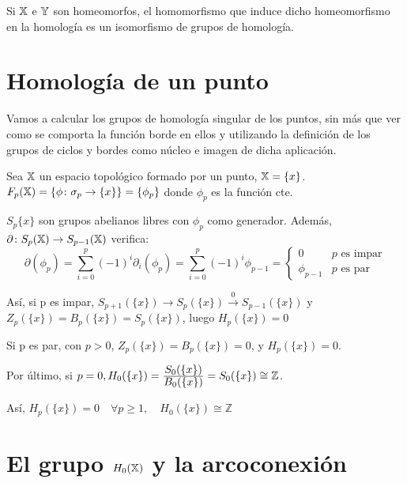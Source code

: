 Si ${\mathbb X}$ e ${\mathbb Y}$ son homeomorfos, el homomorfismo que induce dicho homeomorfismo en la homología es un isomorfismo de grupos de homología.

\pagebreak

\section{Homología de un punto}

Vamos a calcular los grupos de homología singular de los puntos, sin más que ver como se comporta la función borde
en ellos y utilizando la definición de los grupos de ciclos y bordes como núcleo e imagen de dicha aplicación.

Sea ${\mathbb X}$ un espacio topológico formado por un punto, ${\mathbb X} = \{x\}$. \\
$F_{p}({\mathbb X}) = \{ \phi \colon \sigma_p \to \{x\} \} = \{\phi_p\}$ donde $\phi_p$ es la función cte.

$S_p{\{x\}}$ son grupos abelianos libres con $\phi_p$ como generador. Además, $\partial \colon S_{p}({\mathbb X}) \to S_{p-1}({\mathbb X})$ verifica:
\[\partial(\phi_p) = \sum_{i = 0}^p (-1)^i \partial_i(\phi_p) =  \sum_{i = 0}^p (-1)^i \phi_{p-1} = \begin{cases}
                                                                                                            0 & p \text{ es impar} \\
                                                                                                            \phi_{p-1} & p \text{ es par}
                                                                                                    \end{cases}   \]

Así, si p es impar, $S_{p+1}(\{x\}) \to S_p(\{x\}) \xrightarrow{0} S_{p-1}(\{x\})$ y $Z_p(\{x\}) = B_p(\{x\}) = S_p(\{x\})$, luego
$H_p(\{x\}) = 0$

Si p es par, con $p > 0$, $Z_p(\{x\}) = B_p(\{x\}) = 0$, y $H_p(\{x\}) = 0$.

Por último, si $ p = 0, H_0(\{x\}) = \frac{\displaystyle S_0(\{x\})}{\displaystyle B_0(\{x\})} = S_0(\{x\}) \cong \mathbb Z$.

Así, $H_p(\{x\}) = 0 \hspace{1em} \forall p \geq 1, \hspace{1em} H_0(\{x\}) \cong \mathbb Z$

\section{El grupo $H_0({\mathbb X})$ y la arcoconexión}

